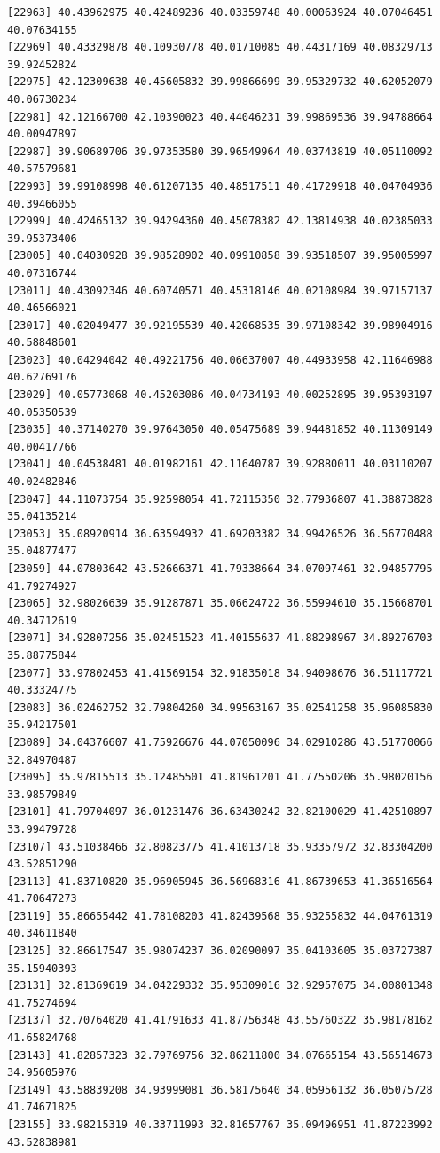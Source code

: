 \documentclass[
  letterpaper,
  DIV=11,
  numbers=noendperiod]{scrartcl}
\begin{document}
\begin{verbatim}
[22963] 40.43962975 40.42489236 40.03359748 40.00063924 40.07046451 40.07634155
[22969] 40.43329878 40.10930778 40.01710085 40.44317169 40.08329713 39.92452824
[22975] 42.12309638 40.45605832 39.99866699 39.95329732 40.62052079 40.06730234
[22981] 42.12166700 42.10390023 40.44046231 39.99869536 39.94788664 40.00947897
[22987] 39.90689706 39.97353580 39.96549964 40.03743819 40.05110092 40.57579681
[22993] 39.99108998 40.61207135 40.48517511 40.41729918 40.04704936 40.39466055
[22999] 40.42465132 39.94294360 40.45078382 42.13814938 40.02385033 39.95373406
[23005] 40.04030928 39.98528902 40.09910858 39.93518507 39.95005997 40.07316744
[23011] 40.43092346 40.60740571 40.45318146 40.02108984 39.97157137 40.46566021
[23017] 40.02049477 39.92195539 40.42068535 39.97108342 39.98904916 40.58848601
[23023] 40.04294042 40.49221756 40.06637007 40.44933958 42.11646988 40.62769176
[23029] 40.05773068 40.45203086 40.04734193 40.00252895 39.95393197 40.05350539
[23035] 40.37140270 39.97643050 40.05475689 39.94481852 40.11309149 40.00417766
[23041] 40.04538481 40.01982161 42.11640787 39.92880011 40.03110207 40.02482846
[23047] 44.11073754 35.92598054 41.72115350 32.77936807 41.38873828 35.04135214
[23053] 35.08920914 36.63594932 41.69203382 34.99426526 36.56770488 35.04877477
[23059] 44.07803642 43.52666371 41.79338664 34.07097461 32.94857795 41.79274927
[23065] 32.98026639 35.91287871 35.06624722 36.55994610 35.15668701 40.34712619
[23071] 34.92807256 35.02451523 41.40155637 41.88298967 34.89276703 35.88775844
[23077] 33.97802453 41.41569154 32.91835018 34.94098676 36.51117721 40.33324775
[23083] 36.02462752 32.79804260 34.99563167 35.02541258 35.96085830 35.94217501
[23089] 34.04376607 41.75926676 44.07050096 34.02910286 43.51770066 32.84970487
[23095] 35.97815513 35.12485501 41.81961201 41.77550206 35.98020156 33.98579849
[23101] 41.79704097 36.01231476 36.63430242 32.82100029 41.42510897 33.99479728
[23107] 43.51038466 32.80823775 41.41013718 35.93357972 32.83304200 43.52851290
[23113] 41.83710820 35.96905945 36.56968316 41.86739653 41.36516564 41.70647273
[23119] 35.86655442 41.78108203 41.82439568 35.93255832 44.04761319 40.34611840
[23125] 32.86617547 35.98074237 36.02090097 35.04103605 35.03727387 35.15940393
[23131] 32.81369619 34.04229332 35.95309016 32.92957075 34.00801348 41.75274694
[23137] 32.70764020 41.41791633 41.87756348 43.55760322 35.98178162 41.65824768
[23143] 41.82857323 32.79769756 32.86211800 34.07665154 43.56514673 34.95605976
[23149] 43.58839208 34.93999081 36.58175640 34.05956132 36.05075728 41.74671825
[23155] 33.98215319 40.33711993 32.81657767 35.09496951 41.87223992 43.52838981

\end{verbatim}
\end{document}
